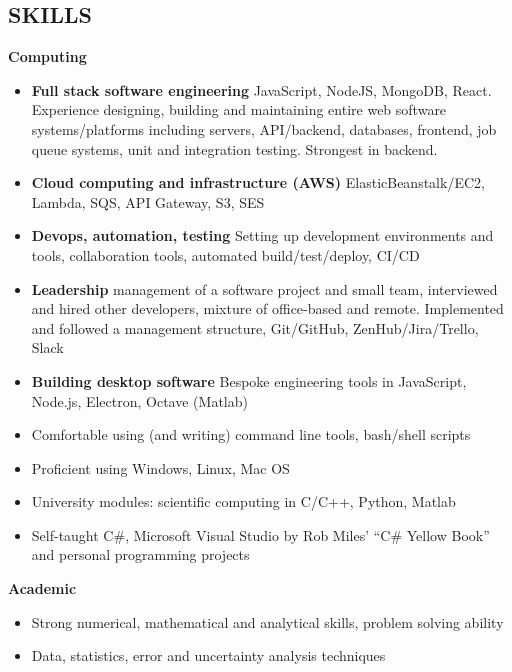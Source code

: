 \documentclass[margin, line, 10pt]{res} %
\begin{document}
\begin{resume}
 
\section{SKILLS}

\textbf{Computing}  
\begin{itemize} 

\item \textbf{Full stack software engineering} JavaScript, NodeJS, MongoDB, React. Experience designing, building and maintaining entire web software systems/platforms including servers, API/backend, databases, frontend, job queue systems, unit and integration testing. Strongest in backend.
\item \textbf{Cloud computing and infrastructure (AWS)} ElasticBeanstalk/EC2, Lambda, SQS, API Gateway, S3, SES
\item \textbf{Devops, automation, testing} Setting up development environments and tools, collaboration tools, automated build/test/deploy, CI/CD
\item \textbf{Leadership} management of a software project and small team, interviewed and hired other developers, mixture of office-based and remote. Implemented and followed a management structure, Git/GitHub, ZenHub/Jira/Trello, Slack
\item \textbf{Building desktop software} Bespoke engineering tools in JavaScript, Node.js, Electron, Octave (Matlab)

\item Comfortable using (and writing) command line tools, bash/shell scripts
\item Proficient using Windows, Linux, Mac OS



\item University modules: scientific computing in C/C++, Python, Matlab


\item Self-taught C\#, Microsoft Visual Studio by Rob Miles' ``C\# Yellow Book'' and personal programming projects


\end{itemize}

\textbf{Academic}  
\begin{itemize}
\item Strong numerical, mathematical and analytical skills, problem solving ability 

\item Data, statistics, error and uncertainty analysis techniques


\end{itemize}
\end{resume}
\end{document}
